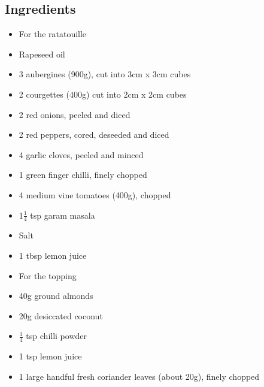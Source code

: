 \documentclass{book}
\begin{document}
\subsection*{Ingredients}
\begin{itemize}
\item For the ratatouille 
\item Rapeseed oil
\item 3 aubergines (900g), cut into 3cm x 3cm cubes
\item 2 courgettes (400g) cut into 2cm x 2cm cubes
\item 2 red onions, peeled and diced 
\item 2 red peppers, cored, deseeded and diced 
\item 4 garlic cloves, peeled and minced 
\item 1 green finger chilli, finely chopped
\item 4 medium vine tomatoes (400g), chopped
\item 1$\frac{1}{4}$ tsp garam masala
\item Salt 
\item 1 tbsp lemon juice
\end{itemize}

\begin{itemize}
\item For the topping 
\item 40g ground almonds 
\item 20g desiccated coconut 
\item $\frac{1}{4}$ tsp chilli powder
\item 1 tsp lemon juice 
\item 1 large handful fresh coriander leaves (about 20g), finely chopped
\end{itemize}
\end{document}
